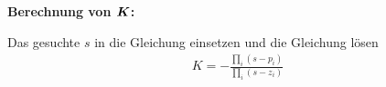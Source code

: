 \begin{tcolorbox}[colback=white!10!white,colframe=blue!50!white,title=Konstruktionsregeln]
        \textbf{Berechnung von $\boldsymbol{K}$:}
        
        Das gesuchte $s$ in die Gleichung einsetzen und die Gleichung lösen
        \begin{align*}
            K = -\frac{\prod_{i}(s-p_i)}{\prod_{i}(s-z_i)}
        \end{align*}
\end{tcolorbox}
